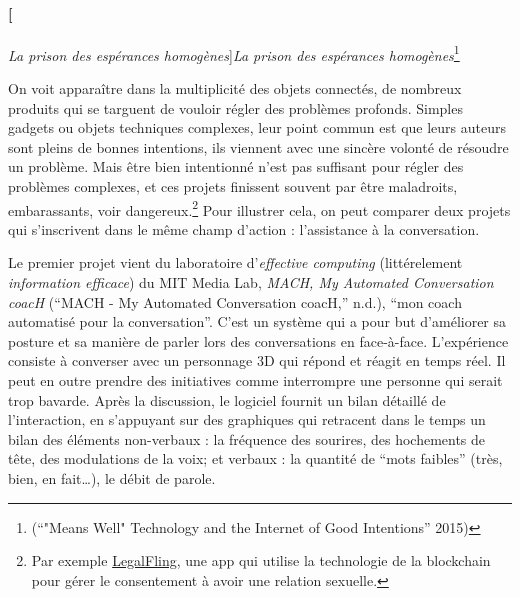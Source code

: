 \documentclass[]{article}
\let\oldparagraph\paragraph
\renewcommand{\paragraph}[1]{\oldparagraph{#1}\mbox{}}
\begin{document}
\hypertarget{la-prison-des-espuxe9rances-homoguxe8nes12b9}{%
\paragraph[\emph{La prison des espérances
homogènes}]{\texorpdfstring{\emph{La prison des espérances
homogènes}\footnote{(``"Means Well" Technology and the Internet of Good
  Intentions'' 2015)}}{La prison des espérances homogènes}}\label{la-prison-des-espuxe9rances-homoguxe8nes12b9}}

On voit apparaître dans la multiplicité des objets connectés, de
nombreux produits qui se targuent de vouloir régler des problèmes
profonds. Simples gadgets ou objets techniques complexes, leur point
commun est que leurs auteurs sont pleins de bonnes intentions, ils
viennent avec une sincère volonté de résoudre un problème. Mais être
bien intentionné n'est pas suffisant pour régler des problèmes
complexes, et ces projets finissent souvent par être maladroits,
embarassants, voir dangereux.\footnote{Par exemple
  \href{https://motherboard.vice.com/en_us/article/paqvn7/dont-fuck-anybody-who-wants-to-get-your-consent-uploaded-to-the-blockchain-legalfling-app}{LegalFling},
  une app qui utilise la technologie de la blockchain pour gérer le
  consentement à avoir une relation sexuelle.} Pour illustrer cela, on
peut comparer deux projets qui s'inscrivent dans le même champ d'action
: l'assistance à la conversation.

Le premier projet vient du laboratoire d'\emph{effective computing}
(littérelement \emph{information efficace}) du MIT Media Lab,
\emph{MACH, My Automated Conversation coacH} (``MACH - My Automated
Conversation coacH,'' n.d.), ``mon coach automatisé pour la
conversation''. C'est un système qui a pour but d'améliorer sa posture
et sa manière de parler lors des conversations en face-à-face.
L'expérience consiste à converser avec un personnage 3D qui répond et
réagit en temps réel. Il peut en outre prendre des initiatives comme
interrompre une personne qui serait trop bavarde. Après la discussion,
le logiciel fournit un bilan détaillé de l'interaction, en s'appuyant
sur des graphiques qui retracent dans le temps un bilan des éléments
non-verbaux : la fréquence des sourires, des hochements de tête, des
modulations de la voix; et verbaux : la quantité de ``mots faibles''
(très, bien, en fait\ldots{}), le débit de parole.
\end{document}
